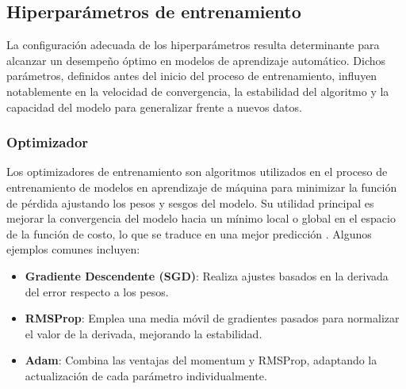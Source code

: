 \subsection{Hiperparámetros de entrenamiento}
La configuración adecuada de los hiperparámetros resulta determinante para alcanzar un desempeño óptimo en modelos de aprendizaje automático. Dichos parámetros, definidos antes del inicio del proceso de entrenamiento, influyen notablemente en la velocidad de convergencia, la estabilidad del algoritmo y la capacidad del modelo para generalizar frente a nuevos datos.

\subsubsection{Optimizador}
Los optimizadores de entrenamiento son algoritmos utilizados en el proceso de entrenamiento de modelos en aprendizaje de máquina para minimizar la función de pérdida ajustando los pesos y sesgos del modelo. Su utilidad principal es mejorar la convergencia del modelo hacia un mínimo local o global en el espacio de la función de costo, lo que se traduce en una mejor predicción \cite{Goodfellow-et-al-2016}. Algunos ejemplos comunes incluyen:

\begin{itemize}
\setlength\itemsep{-0.3em}
    \item \textbf{Gradiente Descendente (SGD)}: Realiza ajustes basados en la derivada del error respecto a los pesos.
    \item \textbf{RMSProp}: Emplea una media móvil de gradientes pasados para normalizar el valor de la derivada, mejorando la estabilidad.
    \item \textbf{Adam}: Combina las ventajas del momentum y RMSProp, adaptando la actualización de cada parámetro individualmente.
\end{itemize}

